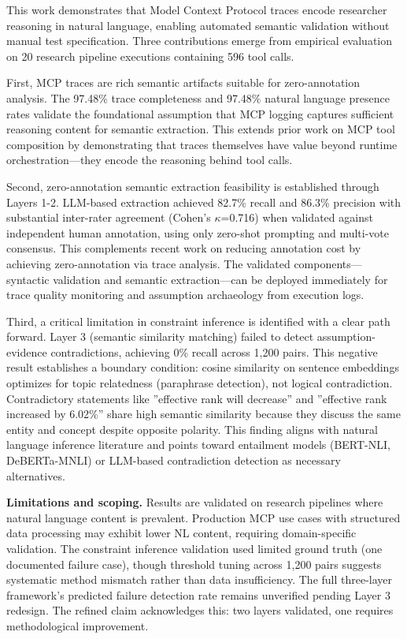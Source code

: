 
This work demonstrates that Model Context Protocol traces encode researcher reasoning in natural language, enabling automated semantic validation without manual test specification. Three contributions emerge from empirical evaluation on 20 research pipeline executions containing 596 tool calls.

First, MCP traces are rich semantic artifacts suitable for zero-annotation analysis. The 97.48\% trace completeness and 97.48\% natural language presence rates validate the foundational assumption that MCP logging captures sufficient reasoning content for semantic extraction. This extends prior work on MCP tool composition by demonstrating that traces themselves have value beyond runtime orchestration---they encode the reasoning behind tool calls.

Second, zero-annotation semantic extraction feasibility is established through Layers 1-2. LLM-based extraction achieved 82.7\% recall and 86.3\% precision with substantial inter-rater agreement (Cohen's $\kappa$=0.716) when validated against independent human annotation, using only zero-shot prompting and multi-vote consensus. This complements recent work on reducing annotation cost by achieving zero-annotation via trace analysis. The validated components---syntactic validation and semantic extraction---can be deployed immediately for trace quality monitoring and assumption archaeology from execution logs.

Third, a critical limitation in constraint inference is identified with a clear path forward. Layer 3 (semantic similarity matching) failed to detect assumption-evidence contradictions, achieving 0\% recall across 1,200 pairs. This negative result establishes a boundary condition: cosine similarity on sentence embeddings optimizes for topic relatedness (paraphrase detection), not logical contradiction. Contradictory statements like ''effective rank will decrease'' and ''effective rank increased by 6.02\%'' share high semantic similarity because they discuss the same entity and concept despite opposite polarity. This finding aligns with natural language inference literature and points toward entailment models (BERT-NLI, DeBERTa-MNLI) or LLM-based contradiction detection as necessary alternatives.

\textbf{Limitations and scoping.} Results are validated on research pipelines where natural language content is prevalent. Production MCP use cases with structured data processing may exhibit lower NL content, requiring domain-specific validation. The constraint inference validation used limited ground truth (one documented failure case), though threshold tuning across 1,200 pairs suggests systematic method mismatch rather than data insufficiency. The full three-layer framework's predicted failure detection rate remains unverified pending Layer 3 redesign. The refined claim acknowledges this: two layers validated, one requires methodological improvement.

